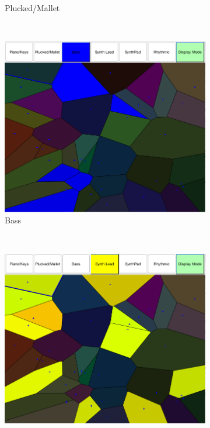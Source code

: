 \documentclass[11pt, oneside]{report}   	%
\begin{document}
\begin{figure}
\begin{subfigure}[b]{0.48\textwidth}
		\caption{Plucked/Mallet}
		\label{fig:categoriesPluckedMallet}
	\end{subfigure}
\\ 
\begin{subfigure}[b]{0.48\textwidth}
	\includegraphics[width=\textwidth]{CategoryBass.png}
	\caption{Bass}
	\label{fig:categoriesBass}
\end{subfigure}
~ %
\begin{subfigure}[b]{0.48\textwidth}
	\includegraphics[width=\textwidth]{CategorySynthLead.png}

\end{subfigure}
\end{figure}
\end{document}
